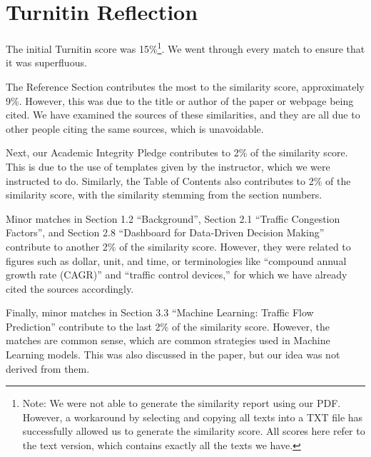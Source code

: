 \documentclass{report}
\begin{document}
\newpage
\doublespacing
\section{Turnitin Reflection}
The initial Turnitin score was 15\%\footnote{Note: We were not able to generate the similarity report using our PDF. However, a workaround by selecting and copying all texts into a TXT file has successfully allowed us to generate the similarity score. All scores here refer to the text version, which contains exactly all the texts we have.}. We went through every match to ensure that it was superfluous.

The Reference Section contributes the most to the similarity score, approximately 9\%. However, this was due to the title or author of the paper or webpage being cited. We have examined the sources of these similarities, and they are all due to other people citing the same sources, which is unavoidable. 

Next, our Academic Integrity Pledge contributes to 2\% of the similarity score. This is due to the use of templates given by the instructor, which we were instructed to do. Similarly, the Table of Contents also contributes to 2\% of the similarity score, with the similarity stemming from the section numbers.

Minor matches in Section 1.2 ``Background'', Section 2.1 ``Traffic Congestion Factors'', and Section 2.8 ``Dashboard for Data-Driven Decision Making'' contribute to another 2\% of the similarity score. However, they were related to figures such as dollar, unit, and time, or terminologies like ``compound annual growth rate (CAGR)'' and ``traffic control devices,'' for which we have already cited the sources accordingly.

Finally, minor matches in Section 3.3 ``Machine Learning: Traffic Flow Prediction'' contribute to the last 2\% of the similarity score. However, the matches are common sense, which are common strategies used in Machine Learning models. This was also discussed in the paper, but our idea was not derived from them.
\end{document}

